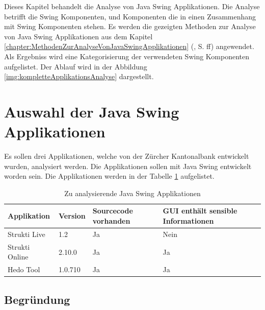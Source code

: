   Dieses Kapitel behandelt die Analyse von Java Swing Applikationen. Die
  Analyse betrifft die Swing Komponenten, und Komponenten die in einen
  Zusammenhang mit Swing Komponenten stehen. Es werden die gezeigten
  Methoden zur Analyse von Java Swing Applikationen aus dem Kapitel 
  \ref{chapter:MethodenZurAnalyseVonJavaSwingApplikationen}
  (, S.
  \pageref{chapter:MethodenZurAnalyseVonJavaSwingApplikationen}ff) angewendet.
  Als Ergebniss wird eine Kategorisierung der verwendeten Swing Komponenten
  aufgelistet. Der Ablauf wird in der Abbildung
  \ref{img:kompletteApplikationsAnalyse} dargestellt.
  \newline

  
  \section{Auswahl der Java Swing Applikationen}
  
  Es sollen drei Applikationen, welche von der Zürcher Kantonalbank entwickelt
  wurden, analysiert werden. Die Applikationen sollen mit Java Swing entwickelt
  worden sein. Die Applikationen werden in der Tabelle
  \ref{tab:zuAnalysierendeJavaSwingApplikationen} aufgelistet.
  \newline
  
  \begin{table}[ht]
    \sffamily 
    \begin{center}
      \begin{tabular}{llp{2cm}p{3.5cm}}
        \toprule
        \textbf{Applikation} & \textbf{Version} & \textbf{Sourcecode vorhanden}
        & \textbf{GUI enthält sensible Informationen}\\
        \midrule
        Strukti Live & 1.2 & Ja & Nein\\
        Strukti Online & 2.10.0 & Ja & Ja\\
        Hedo Tool & 1.0.710 & Ja & Ja\\
        \bottomrule
      \end{tabular}
      \caption{Zu analysierende Java Swing Applikationen}
      \label{tab:zuAnalysierendeJavaSwingApplikationen}
    \end{center}
  \end{table}
  
  \subsection{Begründung}
  
